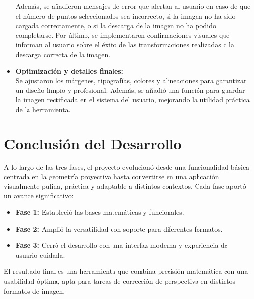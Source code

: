 \begin{itemize}
    Además, se añadieron mensajes de error que alertan al usuario en caso de que el número de puntos seleccionados sea incorrecto, si la imagen no ha sido cargada correctamente, o si la descarga de la imagen no ha podido completarse. Por último, se implementaron confirmaciones visuales que informan al usuario sobre el éxito de las transformaciones realizadas o la descarga correcta de la imagen.
    
    \item \textbf{Optimización y detalles finales:} \\
    Se ajustaron los márgenes, tipografías, colores y alineaciones para garantizar un diseño limpio y profesional. Además, se añadió una función para guardar la imagen rectificada en el sistema del usuario, mejorando la utilidad práctica de la herramienta.
\end{itemize}

\section{Conclusión del Desarrollo}

A lo largo de las tres fases, el proyecto evolucionó desde una funcionalidad básica centrada en la geometría proyectiva hasta convertirse en una aplicación visualmente pulida, práctica y adaptable a distintos contextos. Cada fase aportó un avance significativo:

\begin{itemize}
    \item \textbf{Fase 1:} Estableció las bases matemáticas y funcionales.
    \item \textbf{Fase 2:} Amplió la versatilidad con soporte para diferentes formatos.
    \item \textbf{Fase 3:} Cerró el desarrollo con una interfaz moderna y experiencia de usuario cuidada.
\end{itemize}

El resultado final es una herramienta que combina precisión matemática con una usabilidad óptima, apta para tareas de corrección de perspectiva en distintos formatos de imagen.
